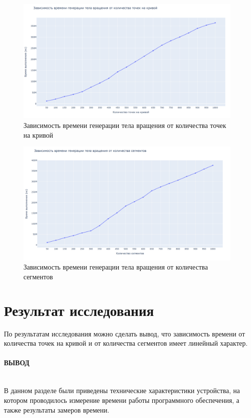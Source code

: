 \begin{figure}[H]
    \centering
    \includegraphics[width=1\linewidth]{images/plots/point_plot.png}
    \caption{Зависимость времени генерации тела вращения от количества точек на кривой}
    \label{fig:point_time_mes}
\end{figure}

\begin{figure}[H]
    \centering
    \includegraphics[width=1\linewidth]{images/plots/seg_plot.png}
    \caption{Зависимость времени генерации тела вращения от количества сегментов}
    \label{fig:seg_time_mes}
\end{figure}

\section{Результат исследования}

По результатам исследования можно сделать вывод, что зависимость времени от количества точек на кривой и от количества сегментов имеет линейный характер.

\paragraph*{ВЫВОД} ${}$ \\

В данном разделе были приведены технические характеристики устройства, на котором проводилось измерение времени работы программного обеспечения, а также результаты замеров времени.
